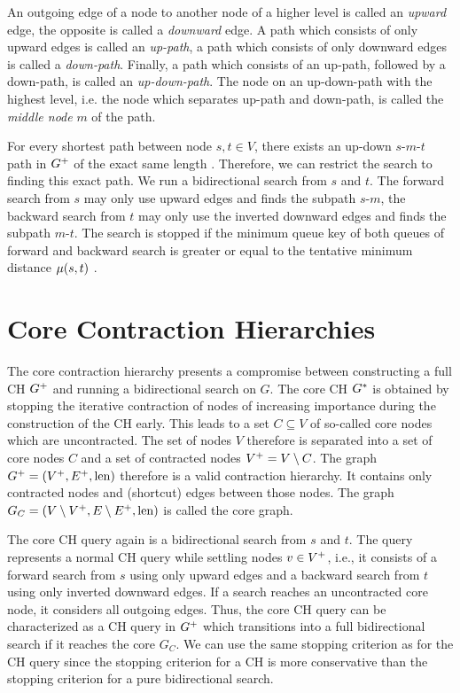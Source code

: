 An outgoing edge of a node to another node of a higher level is called an \emph{upward} edge, the opposite is called a \emph{downward} edge. A path which consists of only upward edges is called an \emph{up-path}, a path which consists of only downward edges is called a \emph{down-path}. Finally, a path which consists of an up-path, followed by a down-path, is called an \emph{up-down-path}. The node on an up-down-path with the highest level, i.e. the node which separates up-path and down-path, is called the \emph{middle node} $m$ of the path.

For every shortest path between node $s,t \in V$, there exists an up-down $s$-$m$-$t$ path in $G^+$ of the exact same length \cite{geisberger:2012}. Therefore, we can restrict the search to finding this exact path. We run a bidirectional search from $s$ and $t$. The forward search from $s$ may only use upward edges and finds the subpath $s$-$m$, the backward search from $t$ may only use the inverted downward edges and finds the subpath $m$-$t$. The search is stopped if the minimum queue key of both queues of forward and backward search is greater or equal to the tentative minimum distance $\mu(s,t)$ \cite{geisberger:2012}.


\section{Core Contraction Hierarchies\label{sec:core_ch}}
The core contraction hierarchy presents a compromise between constructing a full CH $G^+$ and running a bidirectional search on $G$. The core CH $G^*$ is obtained by stopping the iterative contraction of nodes of increasing importance during the construction of the CH early. This leads to a set $C \subseteq V$ of so-called core nodes which are uncontracted. The set of nodes $V$ therefore is separated into a set of core nodes $C$ and a set of contracted nodes $V^+ = V \setminus C$. The graph $G^+ = (V^+,E^+,\operatorname{len})$ therefore is a valid contraction hierarchy. It contains only contracted nodes and (shortcut) edges between those nodes. The graph $G_{C} = (V \setminus V^+,E \setminus E^+,\operatorname{len})$ is called the core graph.

The core CH query again is a bidirectional search from $s$ and $t$. The query represents a normal CH query while settling nodes $v \in V^+$, i.e., it consists of a forward search from $s$ using only upward edges and a backward search from $t$ using only inverted downward edges. If a search reaches an uncontracted core node, it considers all outgoing edges. Thus, the core CH query can be characterized as a CH query in $G^+$ which transitions into a full bidirectional search if it reaches the core $G_C$. We can use the same stopping criterion as for the CH query since the stopping criterion for a CH is more conservative than the stopping criterion for a pure bidirectional search.



